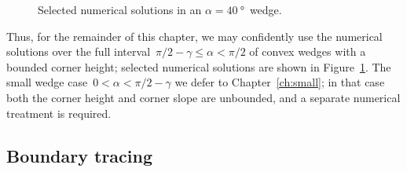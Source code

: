 \begin{figure}
  \newcommand*{\subfigurewidth}{0.45\textwidth}
  \centering
  \begin{subfigure}[t]{\subfigurewidth}
  \end{subfigure}
    \hfill
  \begin{subfigure}[t]{\subfigurewidth}
  \end{subfigure}
  \caption{
    Selected numerical solutions in an $\alpha = \SI{40}{\degree}$~wedge.
  }
  \label{fig:wedge_acute-solution}
\end{figure}

Thus, for the remainder of this chapter,
we may confidently use the numerical solutions
over the full interval~$\pi/2 - \gamma \le \alpha < \pi/2$
of convex wedges with a bounded corner height;
selected numerical solutions are shown
in Figure~\ref{fig:wedge_acute-solution}.
The small wedge case~$0 < \alpha < \pi/2 - \gamma$
we defer to Chapter~\ref{ch:small};
in that case both the corner height and corner slope are unbounded,
and a separate numerical treatment is required.

\subsection{Boundary tracing}
\label{sec:moderate.nonlinear.tracing}

